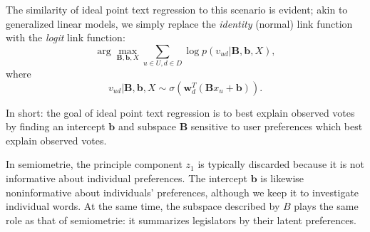 The similarity of ideal point text regression to this scenario is
evident; akin to generalized linear models, we simply replace the
\emph{identity} (normal) link function with the \emph{logit} link
function:
  \[
  \arg \max_{\bm B, \bm b, X} \sum_{u \in U, d \in D} \log p( v_{ud} | \bm B, \bm b, X), \]
where \[ v_{ud} | \bm B, \bm b, X \sim \sigma( \bm w_d^T (\bm B x_u + \bm b) ). \]

In short: the goal of ideal point text regression is to best explain
observed votes by finding an intercept $\bm b$ and subspace $\bm B$
sensitive to user preferences which best explain observed votes.

In semiometrie, the principle component $z_1$ is typically discarded
because it is not informative about individual preferences.  The
intercept $\bm b$ is likewise noninformative about individuals'
preferences, although we keep it to investigate individual words.  At
the same time, the subspace described by $B$ plays the same role as
that of semiometrie: it summarizes legislators by their latent
preferences.